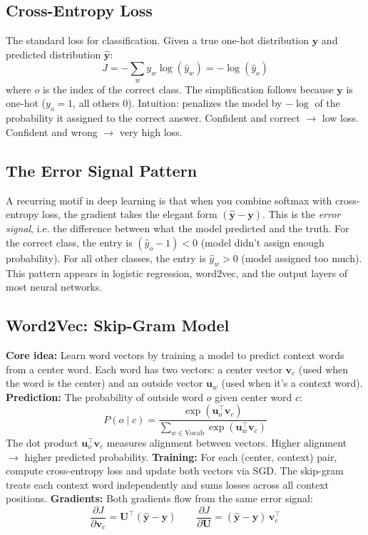 \documentclass[11pt]{article}
\begin{document}
\subsection{Cross-Entropy Loss}
The standard loss for classification. Given a true one-hot distribution $\mathbf{y}$ and predicted distribution $\hat{\mathbf{y}}$:
\[
J = -\sum_{w} y_w \log(\hat{y}_w) = -\log(\hat{y}_o)
\]
where $o$ is the index of the correct class. The simplification follows because $\mathbf{y}$ is one-hot ($y_o = 1$, all others 0). Intuition: penalizes the model by $-\log$ of the probability it assigned to the correct answer. Confident and correct $\to$ low loss. Confident and wrong $\to$ very high loss.
\subsection{The Error Signal Pattern}
A recurring motif in deep learning is that when you combine softmax with cross-entropy loss, the gradient takes the elegant form $(\hat{\mathbf{y}} - \mathbf{y})$. This is the \textit{error signal}, i.e. the difference between what the model predicted and the truth. For the correct class, the entry is $(\hat{y}_o - 1) < 0$ (model didn't assign enough probability). For all other classes, the entry is $\hat{y}_w > 0$ (model assigned too much). This pattern appears in logistic regression, word2vec, and the output layers of most neural networks.
\subsection{Word2Vec: Skip-Gram Model}
\textbf{Core idea:} Learn word vectors by training a model to predict context words from a center word. Each word has two vectors: a center vector $\mathbf{v}_c$ (used when the word is the center) and an outside vector $\mathbf{u}_w$ (used when it's a context word).
\textbf{Prediction:} The probability of outside word $o$ given center word $c$:
\[
P(o \mid c) = \frac{\exp(\mathbf{u}_o^\top \mathbf{v}_c)}{\sum_{w \in \text{Vocab}} \exp(\mathbf{u}_w^\top \mathbf{v}_c)}
\]
The dot product $\mathbf{u}_o^\top \mathbf{v}_c$ measures alignment between vectors. Higher alignment $\to$ higher predicted probability.
\textbf{Training:} For each (center, context) pair, compute cross-entropy loss and update both vectors via SGD. The skip-gram treats each context word independently and sums losses across all context positions.
\textbf{Gradients:} Both gradients flow from the same error signal:
\[
\frac{\partial J}{\partial \mathbf{v}_c} = \mathbf{U}^\top(\hat{\mathbf{y}} - \mathbf{y}) \qquad \frac{\partial J}{\partial \mathbf{U}} = (\hat{\mathbf{y}} - \mathbf{y})\,\mathbf{v}_c^\top
\]
\end{document}
